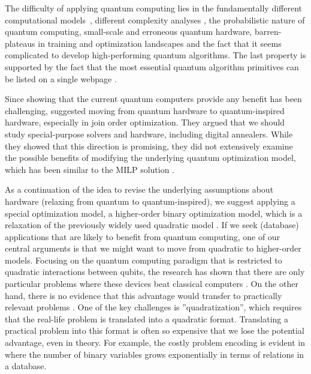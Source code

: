 The difficulty of applying quantum computing lies in the fundamentally different computational models~\cite{Nielsen_Chuang_2010}, different complexity analyses \cite{aaronson2016complexitytheoreticfoundationsquantumsupremacy}, the probabilistic nature of quantum computing, small-scale and erroneous quantum hardware, barren-plateaus in training and optimization landscapes \cite{Ragone_Bakalov_Sauvage_Kemper_Ortiz_Marrero_Larocca_Cerezo_2024} and the fact that it seems complicated to develop high-performing quantum algorithms. The last property is supported by the fact that the most essential quantum algorithm primitives can be listed on a single webpage \cite{quantum_algorithm_zoo}. 

Since showing that the current quantum computers provide any benefit has been challenging, \cite{10.14778/3632093.3632112} suggested moving from quantum hardware to quantum-inspired hardware, especially in join order optimization. They argued that we should study special-purpose solvers and hardware, including digital annealers. While they showed that this direction is promising, they did not extensively examine the possible benefits of modifying the underlying quantum optimization model, which has been similar to the MILP solution \cite{Trummer_Koch_2017}.

As a continuation of the idea to revise the underlying assumptions about hardware (relaxing from quantum to quantum-inspired), we suggest applying a special optimization model, a higher-order binary optimization model, which is a relaxation of the previously widely used quadratic model \cite{Schonberger_Scherzinger_Mauerer,Trummer_Koch_2017,10.14778/3632093.3632112,Schonberger_Trummer_Mauerer_2023,Nayak_Winker_Groppe_Groppe_2024, DBLP:conf/q-data/SaxenaSS24}. If we seek (database) applications that are likely to benefit from quantum computing, one of our central arguments is that we might want to move from quadratic to higher-order models. Focusing on the quantum computing paradigm that is restricted to quadratic interactions between qubits, the research has shown that there are only particular problems where these devices beat classical computers \cite{PhysRevX.6.031015,King_Nocera_Rams_Dziarmaga_Wiersema_Bernoudy_Raymond_Kaushal_Heinsdorf_Harris_etal_2024}. On the other hand, there is no evidence that this advantage would transfer to practically relevant problems \cite{Willsch_Willsch_Gonzalez_Calaza_Jin_De_Raedt_Svensson_Michielsen_2022}. One of the key challenges is ''quadratization'', which requires that the real-life problem is translated into a quadratic format. Translating a practical problem into this format is often so expensive that we lose the potential advantage, even in theory. For example, the costly problem encoding is evident in \cite{Nayak_Winker_Groppe_Groppe_2024} where the number of binary variables grows exponentially in terms of relations in a database.

